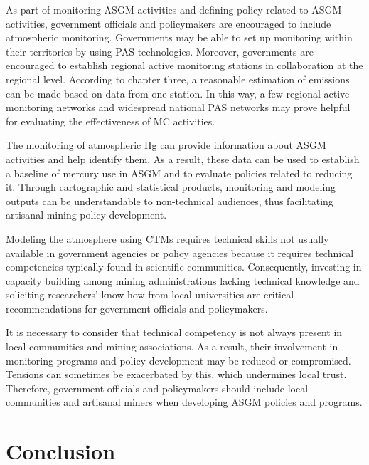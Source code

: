As part of monitoring ASGM activities and defining policy related to ASGM activities, government officials and policymakers are encouraged to include atmospheric monitoring.  Governments may be able to set up monitoring within their territories by using PAS technologies. Moreover, governments are encouraged to establish regional active monitoring stations in collaboration at the regional level. According to chapter three, a reasonable estimation of emissions can be made based on data from one station. In this way, a few regional active monitoring networks and widespread national PAS networks may prove helpful for evaluating the effectiveness of MC activities.
  
The monitoring of atmospheric Hg can provide information about ASGM activities and help identify them. As a result, these data can be used to establish a baseline of mercury use in ASGM and to evaluate policies related to reducing it. Through cartographic and statistical products, monitoring and modeling outputs can be understandable to non-technical audiences, thus facilitating artisanal mining policy development. 

Modeling the atmosphere using CTMs requires technical skills not usually available in government agencies or policy agencies because it requires technical competencies typically found in scientific communities. Consequently, investing in capacity building among mining administrations lacking technical knowledge and soliciting researchers' know-how from local universities are critical recommendations for government officials and policymakers.  
 
It is necessary to consider that technical competency is not always present in local communities and mining associations. As a result, their involvement in monitoring programs and policy development may be reduced or compromised. Tensions can sometimes be exacerbated by this, which undermines local trust. Therefore, government officials and policymakers should include local communities and artisanal miners when developing ASGM policies and programs. 


\section{Conclusion}